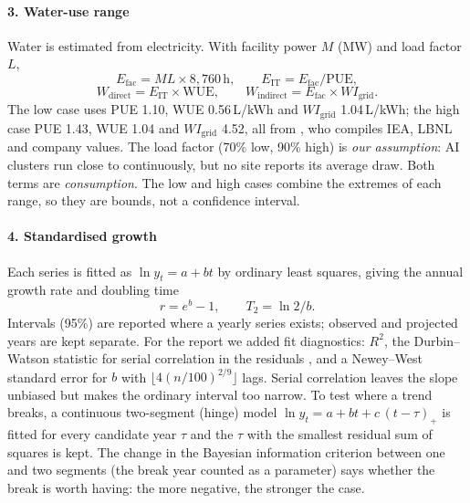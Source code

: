 \paragraph{3. Water-use range} Water is estimated from electricity. With facility power $M$ (MW) and load factor
$L$,
\begin{equation}
E_{\text{fac}} = M L \times 8{,}760\,\text{h},\qquad E_{\text{IT}} = E_{\text{fac}} / \text{PUE},
\end{equation}
\begin{equation}
W_{\text{direct}} = E_{\text{IT}}\times\text{WUE},\qquad W_{\text{indirect}} = E_{\text{fac}}\times WI_{\text{grid}}.
\end{equation}
The low case uses PUE 1.10, WUE 0.56\,L/kWh and $WI_{\text{grid}}$ 1.04\,L/kWh; the high case PUE 1.43, WUE 1.04
and $WI_{\text{grid}}$ 4.52, all from \citet{devriesgao2026}, who compiles IEA, LBNL and company values. The load factor
(70\% low, 90\% high) is \emph{our assumption}: AI clusters run close to continuously, but no site reports its average
draw. Both terms are \emph{consumption}. The low and high cases combine the extremes of each range, so they are bounds,
not a confidence interval.

\paragraph{4. Standardised growth} Each series is fitted as $\ln y_t = a + bt$ by ordinary least squares, giving the
annual growth rate and doubling time
\begin{equation}
r = e^{b} - 1,\qquad T_2 = \ln 2 / b.
\end{equation}
Intervals (95\%) are reported where a yearly series exists; observed and projected years are kept separate. For the
report we added fit diagnostics: $R^2$, the Durbin--Watson statistic for serial correlation in the residuals
\citep{durbin1950}, and a Newey--West standard error for $b$ \citep{newey1987} with
$\lfloor 4(n/100)^{2/9}\rfloor$ lags. Serial correlation leaves the slope unbiased but makes the ordinary interval too
narrow. To test where a trend breaks, a continuous two-segment (hinge) model
$\ln y_t = a + bt + c\,(t-\tau)_+$ is fitted for every candidate year $\tau$ and the $\tau$ with the smallest residual sum
of squares is kept. The change in the Bayesian information criterion \citep{schwarz1978} between one and two segments
(the break year counted as a parameter) says whether the break is worth having: the more negative, the stronger the case.

